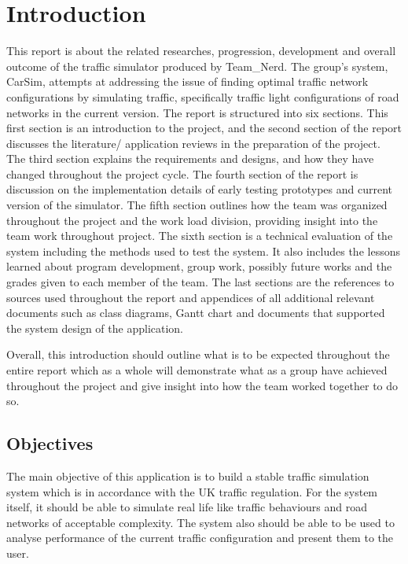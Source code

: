 \documentclass[11pt]{article}
\begin{document}
\section{Introduction} %
This report is about the related researches, progression, development and overall outcome of the traffic simulator produced by Team\_Nerd. The group’s system, CarSim, attempts at addressing the issue of finding optimal traffic network configurations by simulating traffic, specifically traffic light configurations of road networks in the current version. The report is structured into six sections. This first section is an introduction to the project, and the second section of the report discusses the literature/ application reviews in the preparation of the project. The third section explains the requirements and designs, and how they have changed throughout the project cycle. The fourth section of the report is discussion on the implementation details of early testing prototypes and current version of the simulator. The fifth section outlines how the team was organized throughout the project and the work load division, providing insight into the team work throughout project. The sixth section is a technical evaluation of the system including the methods used to test the system. It also includes the lessons learned about program development, group work, possibly future works and the grades given to each member of the team. The last sections are the references to sources used throughout the report and appendices of all additional relevant documents such as class diagrams, Gantt chart and documents that supported the system design of the application. 

Overall, this introduction should outline what is to be expected throughout the entire report which as a whole will demonstrate what as a group have achieved throughout the project and give insight into how the team worked together to do so.

\subsection{Objectives}
The main objective of this application is to build a stable traffic simulation system which is in accordance with the UK traffic regulation. For the system itself, it should be able to simulate real life like traffic behaviours  and road networks of  acceptable complexity.  The system also should be able to be used to analyse performance of the current traffic configuration and present them to the user.
\end{document}
